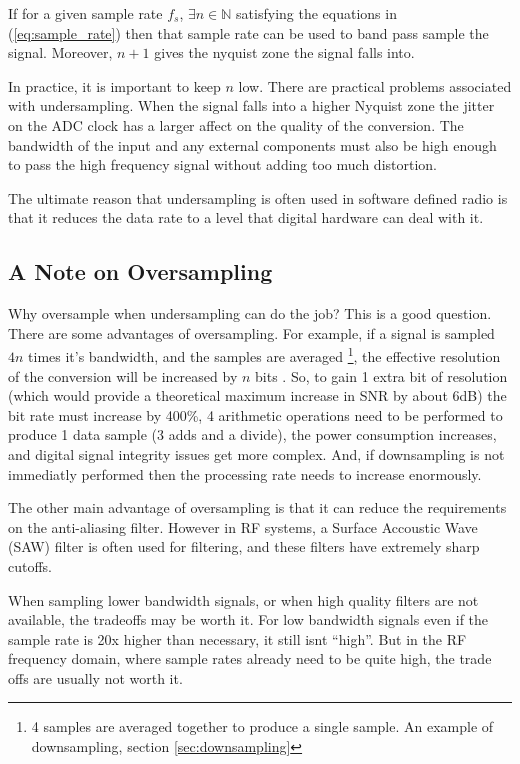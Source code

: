 \documentclass[a4paper, 12pt, notitlepage]{article}
\begin{document}
If for a given sample rate $f_s$, $\exists n \in \mathbb{N}$ satisfying the equations in (\ref{eq:sample_rate}) then that sample rate can be used to band pass sample the signal.  Moreover, $n+1$ gives the nyquist zone the signal falls into.

In practice, it is important to keep $n$ low.  There are practical problems associated with undersampling.  When the signal falls into a higher Nyquist zone the jitter on the ADC clock has a larger affect on the quality of the conversion.  The bandwidth of the input and any external components must also be high enough to pass the high frequency signal without adding too much distortion.

The ultimate reason that undersampling is often used in software defined radio is that it reduces the data rate to a level that digital hardware can deal with it.

\subsection{A Note on Oversampling}
\label{sec:oversampling}
Why oversample when undersampling can do the job\cite{why_oversample}?  This is a good question.  There are some advantages of oversampling.  For example, if a signal is sampled $4n$ times it's bandwidth, and the samples are averaged \footnote{4 samples are averaged together to produce a single sample.  An example of downsampling, section \ref{sec:downsampling}}, the effective resolution of the conversion will be increased by $n$ bits \cite{oversample_extra_bits}.  So, to gain 1 extra bit of resolution (which would provide a theoretical maximum increase in SNR by about 6dB) the bit rate must increase by 400\%, 4 arithmetic operations need to be performed to produce 1 data sample (3 adds and a divide), the power consumption increases, and digital signal integrity issues get more complex.  And, if downsampling is not immediatly performed then the processing rate needs to increase enormously.

The other main advantage of oversampling is that it can reduce the requirements on the anti-aliasing filter.  However in RF systems, a Surface Accoustic Wave (SAW) filter is often used for filtering, and these filters have extremely sharp cutoffs.

When sampling lower bandwidth signals, or when high quality filters are not available, the tradeoffs may be worth it.  For low bandwidth signals even if the sample rate is 20x higher than necessary, it still isnt ``high''.  But in the RF frequency domain, where sample rates already need to be quite high, the trade offs are usually not worth it.
\end{document}
